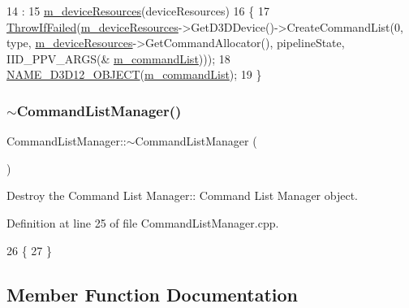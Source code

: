 \begin{DoxyCode}
14                                                                       :
15     \mbox{\hyperlink{class_command_list_manager_a1c48b5dc7b34886ce5057ac194a2385e}{m\_deviceResources}}(deviceResources)
16 \{
17     \mbox{\hyperlink{_direct_x_helper_8h_abca3eeca6b5772a1112e0a9a9e3d9013}{ThrowIfFailed}}(\mbox{\hyperlink{class_command_list_manager_a1c48b5dc7b34886ce5057ac194a2385e}{m\_deviceResources}}->GetD3DDevice()->CreateCommandList(0, 
      type, \mbox{\hyperlink{class_command_list_manager_a1c48b5dc7b34886ce5057ac194a2385e}{m\_deviceResources}}->GetCommandAllocator(), pipelineState, IID\_PPV\_ARGS(&
      \mbox{\hyperlink{class_command_list_manager_a1366f0acddca408167ffcab59be71ddb}{m\_commandList}})));
18     \mbox{\hyperlink{_direct_x_helper_8h_aac0bf77e771c5756a028295b6400839f}{NAME\_D3D12\_OBJECT}}(\mbox{\hyperlink{class_command_list_manager_a1366f0acddca408167ffcab59be71ddb}{m\_commandList}});
19 \}
\end{DoxyCode}
\mbox{\label{class_command_list_manager_abd86fdbb82a3488ff90c3d42524c0b88}} 
\subsubsection{\texorpdfstring{$\sim$\+Command\+List\+Manager()}{~CommandListManager()}}
{\footnotesize\ttfamily Command\+List\+Manager\+::$\sim$\+Command\+List\+Manager (\begin{DoxyParamCaption}{ }\end{DoxyParamCaption})}



Destroy the Command List Manager\+:\+: Command List Manager object. 



Definition at line 25 of file Command\+List\+Manager.\+cpp.


\begin{DoxyCode}
26 \{
27 \}
\end{DoxyCode}


\subsection{Member Function Documentation}
\mbox{\label{class_command_list_manager_a2ed1b25ab6762e63d52c47dfa52d3a00}} 
